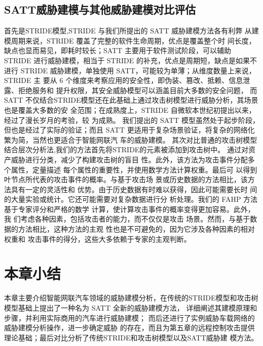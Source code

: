 \subsection{SATT威胁建模与其他威胁建模对比评估}
首先是STRIDE模型,STRIDE 与我们所提出的 SATT 威胁建模方法各有利弊
从建模周期来说，STRIDE 覆盖了完整的软件生命周期，优点是覆盖整个时
间长度，缺点也显而易见，即耗时较长；SATT 主要用于软件测试阶段，可以辅助
STRIDE 进行威胁建模，相当于 STRIDE 的补充，优点是周期短，缺点是如果不进行
STRIDE 威胁建模，单独使用 SATT，可能较为单薄；从维度数量上来说，STRIDE 主
要从 6 个维度来考察应用的安全性，即伪装、篡改、抵赖、信息泄露、拒绝服务和
提升权限，其安全威胁模型可以涵盖目前大多数的安全问题，
而 SATT 不仅结合STRIDE模型还在此基础上通过攻击树模型进行威胁分析，其场景也是覆盖大多数的安
全范围；在成熟度上，STRIDE 自微软本世纪初提出以来，经过了漫长岁月的考验，较
为成熟。
我们提出的 SATT 模型虽然处于起步阶段，但也是经过了实际的验证；而且
SATT 更适用于复杂场景验证，将复杂的网络化繁为简，当然也更适合于智能网联汽
车的威胁建模。
\newline
其次对比普通的攻击树模型结合层次分析法,我们的方法首先将STRIDE的元素被添加到攻击树中。
通过对资产威胁进行分类，减少了构建攻击树的盲目
性。此外，该方法为攻击事件分配多个属性，定量描述
每个属性的重要性，并使用数学方法计算权重。最后可
以得到叶节点所代表的攻击事件的概率。与基于攻击场
景或历史数据的方法相比，该方法具有一定的灵活性和
优势。由于历史数据有时难以获得，因此可能需要长时
间的大量实验或统计。它还可能需要对复杂数据进行分
析处理。我们的 FAHP 方法基于专家评分和严格的数学
计算，使计算攻击事件的概率变得更加容易。此外，我
们考虑各种因素，包括攻击者的能力，而不仅仅是攻击
场景。然而，与基于数据的方法相比，这种方法的主观
性也是不可避免的，因为它涉及各种因素的相对权重和
攻击事件的得分，这些大多依赖于专家的主观判断。
\section{本章小结}
本章主要介绍智能网联汽车领域的威胁建模分析，在传统的STRIDE模型和攻击树模型基础上提出了一种名为 SATT 全新的威胁建模方法，
详细阐述其建模原理和步骤，并利用实际商用的汽车进行威胁建模；
而后还进行了实例威胁车载网络的威胁建模分析操作，进一步确定威胁
的存在，而且为第五章的远程控制攻击提供理论基础；最后对比分析了传统STRIDE和攻击树模型以及SATT威胁建
模方法。